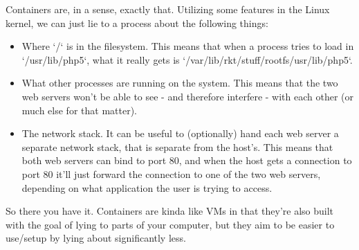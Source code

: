 \documentclass[9pt]{extarticle} %
\begin{document}
\begin{minipage}[t]{.66\linewidth}
Containers are, in a sense, exactly that. Utilizing some features in the Linux
kernel, we can just lie to a process about the following things:
\begin{itemize}
\item Where `/` is in the filesystem. This means that when a process tries to load
  in `/usr/lib/php5`, what it really gets is
  `/var/lib/rkt/stuff/rootfs/usr/lib/php5`.
\item What other processes are running on the system. This means that the two web
  servers won't be able to see - and therefore interfere - with each other (or
  much else for that matter).
\item The network stack. It can be useful to (optionally) hand each web server a
  separate network stack, that is separate from the host's. This means that
  both web servers can bind to port 80, and when the host gets a connection to
  port 80 it'll just forward the connection to one of the two web servers,
  depending on what application the user is trying to access.
\end{itemize}

So there you have it. Containers are kinda like VMs in that they're also built
with the goal of lying to parts of your computer, but they aim to be easier to
use/setup by lying about significantly less.


\end{minipage} %
\end{document}
